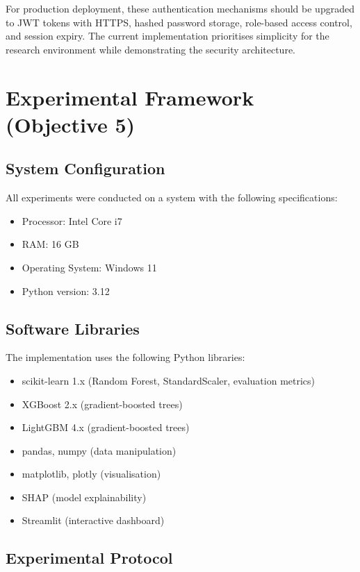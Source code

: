 \documentclass[12pt,a4paper,oneside]{report}
\begin{document}
For production deployment, these authentication mechanisms should be upgraded to JWT tokens with HTTPS, hashed password storage, role-based access control, and session expiry. The current implementation prioritises simplicity for the research environment while demonstrating the security architecture.

\section{Experimental Framework (Objective 5)}

\subsection{System Configuration}

All experiments were conducted on a system with the following specifications:
\begin{itemize}
    \item Processor: Intel Core i7
    \item RAM: 16 GB
    \item Operating System: Windows 11
    \item Python version: 3.12
\end{itemize}

\subsection{Software Libraries}

The implementation uses the following Python libraries:
\begin{itemize}
    \item scikit-learn 1.x (Random Forest, StandardScaler, evaluation metrics)
    \item XGBoost 2.x (gradient-boosted trees)
    \item LightGBM 4.x (gradient-boosted trees)
    \item pandas, numpy (data manipulation)
    \item matplotlib, plotly (visualisation)
    \item SHAP (model explainability)
    \item Streamlit (interactive dashboard)
\end{itemize}

\subsection{Experimental Protocol}
\end{document}
